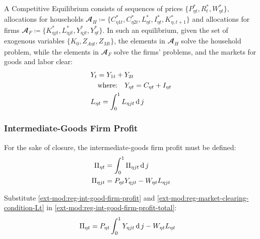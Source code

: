 \documentclass[../thesis.tex]{subfiles}
\begin{document}
	A Competitive Equilibrium consists of sequences of prices $\{P_{\eta t}^{\ast}, R_t^{\ast}, W_{\eta t}^{\ast}\}$, allocations for households $\mathbfscr{A}_H \coloneq \{C_{\eta 1 t}^{\ast}, C_{\eta 2 t}^{\ast}, L_{\eta t}^{\ast}, I_{\eta t}^{\ast}, K_{\eta, t+1}^{\ast}\}$ and allocations  for firms $\mathbfscr{A}_F \coloneq \{K_{\eta jt}^{\ast}, L_{\eta jt}^{\ast}, Y_{\eta jt}^{\ast}, Y_{\eta t}^{\ast}\}$. In such an equilibrium, given the set of exogenous variables $\{K_0, Z_{A\eta t}, Z_{Mt}\}$, the elements in $\mathbfscr{A}_H$ solve the household problem, while the elements in $\mathbfscr{A}_F$ solve the firms' problems, and the markets for goods and labor clear: %
	\begin{align}
		& Y_{t} = Y_{1 t} + Y_{2 t} \label{ext-mod:reg-market-clearing-condition-Yt} \\
		& \quad \text{where:} \quad Y_{\eta t} = C_{\eta t} + I_{\eta t} \label{ext-mod:reg-regional-demand} \\
		& L_{\eta t} = \int_{0}^{1} L_{\eta jt} \operatorname{d} j \label{ext-mod:reg-market-clearing-condition-Lt} 
	\end{align}
	

\subsubsection*{Intermediate-Goods Firm Profit}

For the sake of closure, the intermediate-goods firm profit must be defined:
\begin{align}
	\Pi_{\eta t} &= \int_{0}^{1} \Pi_{\eta jt} \operatorname{d} j \label{ext-mod:reg-int-good-firm-profit-total} \\
	\Pi_{\eta jt} &= P_{\eta t} Y_{\eta jt} - W_{\eta t} L_{\eta jt} \label{ext-mod:reg-int-good-firm-profit}
\end{align}

Substitute \ref{ext-mod:reg-int-good-firm-profit} and \ref{ext-mod:reg-market-clearing-condition-Lt} in \ref{ext-mod:reg-int-good-firm-profit-total}:
\begin{align}
	\Pi_{\eta t} &= P_{\eta t} \int_{0}^{1} Y_{\eta jt} \operatorname{d} j - W_{\eta t} L_{\eta t} \label{ext-mod:reg-int-good-firm-profit-total-2}
\end{align}
\end{document}
